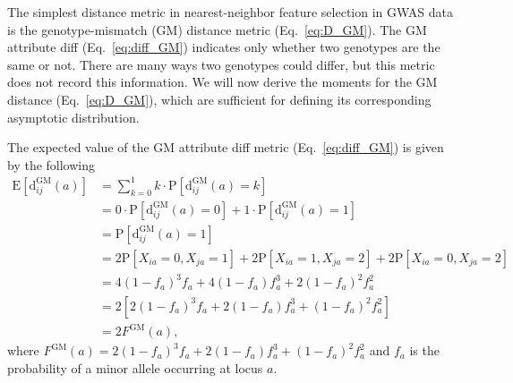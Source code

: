 \documentclass[10pt,letterpaper]{article}
\begin{document}
The simplest distance metric in nearest-neighbor feature selection in GWAS data is the genotype-mismatch (GM) distance metric (Eq.~\ref{eq:D_GM}). The GM attribute diff (Eq.~\ref{eq:diff_GM}) indicates only whether two genotypes are the same or not. There are many ways two genotypes could differ, but this metric does not record this information. We will now derive the moments for the GM distance (Eq.~\ref{eq:D_GM}), which are sufficient for defining its corresponding asymptotic distribution.

The expected value of the GM attribute diff metric (Eq.~\ref{eq:diff_GM}) is given by the following
%
\begin{equation}\label{eq:mean_diff_GM}
\begin{aligned}
\text{E}\left[\text{d}^\text{GM}_{ij}(a)\right] &= \sum_{k=0}^{1} k \cdot \text{P}\left[\text{d}^\text{GM}_{ij}(a) = k\right] \\
&= 0 \cdot \text{P}\left[\text{d}^\text{GM}_{ij}(a) = 0\right] + 1 \cdot \text{P}\left[\text{d}^\text{GM}_{ij}(a) = 1\right] \\
&= \text{P}\left[\text{d}^\text{GM}_{ij}(a) = 1\right] \\
&= 2\text{P}[X_{ia} = 0, X_{ja} = 1] + 2\text{P}[X_{ia} = 1, X_{ja} = 2] + 2\text{P}[X_{ia} = 0, X_{ja} = 2] \\
&= 4(1 - f_a)^3f_a + 4(1 - f_a)f^3_a + 2(1 - f_a)^2f^2_a \\
&= 2\left[2(1 - f_a)^3f_a + 2(1 - f_a)f^3_a + (1 - f_a)^2f^2_a\right] \\
&= 2F^\text{GM}(a),
\end{aligned}
\end{equation}
%
where $F^\text{GM}(a) = 2(1 - f_a)^3f_a + 2(1 - f_a)f^3_a + (1 - f_a)^2f^2_a$ and $f_a$ is the probability of a minor allele occurring at locus $a$.
\end{document}
